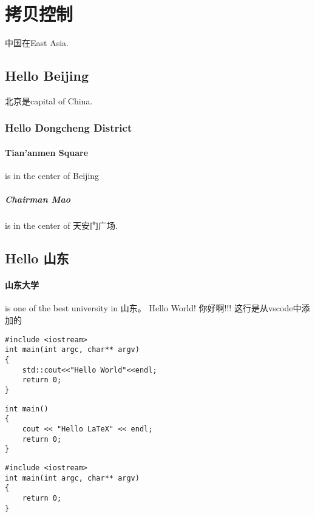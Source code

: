 
\section{拷贝控制}
中国在East Asia.
\subsection{Hello Beijing}
北京是capital of China.
\subsubsection{Hello Dongcheng District}
\paragraph{Tian'anmen Square}
is in the center of Beijing
\subparagraph{Chairman Mao}
is in the center of 天安门广场.
\subsection{Hello 山东}
\paragraph{山东大学} is one of the best university in 山东。\newline
Hello World! 你好啊!!!
这行是从vscode中添加的


\begin{verbatim}
#include <iostream>
int main(int argc, char** argv)
{
    std::cout<<"Hello World"<<endl;
    return 0;    
}
\end{verbatim}

\begin{verbatim}
int main()
{
    cout << "Hello LaTeX" << endl;
    return 0;
}
\end{verbatim}

\begin{lstlisting}[caption= hello world]
#include <iostream>
int main(int argc, char** argv)
{
    return 0;
}
\end{lstlisting}

